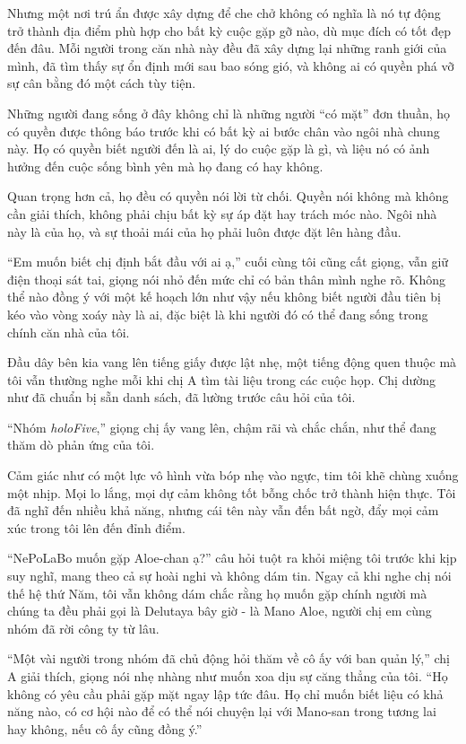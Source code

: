 \documentclass[../main.tex]{subfiles}
\begin{document}
Nhưng một nơi trú ẩn được xây dựng để che chở không có nghĩa là nó tự động trở thành địa điểm phù hợp cho bất kỳ cuộc gặp gỡ nào, dù mục đích có tốt đẹp đến đâu. Mỗi người trong căn nhà này đều đã xây dựng lại những ranh giới của mình, đã tìm thấy sự ổn định mới sau bao sóng gió, và không ai có quyền phá vỡ sự cân bằng đó một cách tùy tiện.

Những người đang sống ở đây không chỉ là những người ``có mặt'' đơn thuần, họ có quyền được thông báo trước khi có bất kỳ ai bước chân vào ngôi nhà chung này. Họ có quyền biết người đến là ai, lý do cuộc gặp là gì, và liệu nó có ảnh hưởng đến cuộc sống bình yên mà họ đang có hay không.

Quan trọng hơn cả, họ đều có quyền nói lời từ chối. Quyền nói không mà không cần giải thích, không phải chịu bất kỳ sự áp đặt hay trách móc nào. Ngôi nhà này là của họ, và sự thoải mái của họ phải luôn được đặt lên hàng đầu.

``Em muốn biết chị định bắt đầu với ai ạ,'' cuối cùng tôi cũng cất giọng, vẫn giữ điện thoại sát tai, giọng nói nhỏ đến mức chỉ có bản thân mình nghe rõ. Không thể nào đồng ý với một kế hoạch lớn như vậy nếu không biết người đầu tiên bị kéo vào vòng xoáy này là ai, đặc biệt là khi người đó có thể đang sống trong chính căn nhà của tôi.

Đầu dây bên kia vang lên tiếng giấy được lật nhẹ, một tiếng động quen thuộc mà tôi vẫn thường nghe mỗi khi chị A tìm tài liệu trong các cuộc họp. Chị dường như đã chuẩn bị sẵn danh sách, đã lường trước câu hỏi của tôi.

``Nhóm \textit{holoFive},'' giọng chị ấy vang lên, chậm rãi và chắc chắn, như thể đang thăm dò phản ứng của tôi.

Cảm giác như có một lực vô hình vừa bóp nhẹ vào ngực, tim tôi khẽ chùng xuống một nhịp. Mọi lo lắng, mọi dự cảm không tốt bỗng chốc trở thành hiện thực. Tôi đã nghĩ đến nhiều khả năng, nhưng cái tên này vẫn đến bất ngờ, đẩy mọi cảm xúc trong tôi lên đến đỉnh điểm.

``NePoLaBo muốn gặp Aloe-chan ạ?'' câu hỏi tuột ra khỏi miệng tôi trước khi kịp suy nghĩ, mang theo cả sự hoài nghi và không dám tin. Ngay cả khi nghe chị nói thế hệ thứ Năm, tôi vẫn không dám chắc rằng họ muốn gặp chính người mà chúng ta đều phải gọi là Delutaya bây giờ - là Mano Aloe, người chị em cùng nhóm đã rời công ty từ lâu.

``Một vài người trong nhóm đã chủ động hỏi thăm về cô ấy với ban quản lý,'' chị A giải thích, giọng nói nhẹ nhàng như muốn xoa dịu sự căng thẳng của tôi. ``Họ không có yêu cầu phải gặp mặt ngay lập tức đâu. Họ chỉ muốn biết liệu có khả năng nào, có cơ hội nào để có thể nói chuyện lại với Mano-san trong tương lai hay không, nếu cô ấy cũng đồng ý.''
\end{document}
